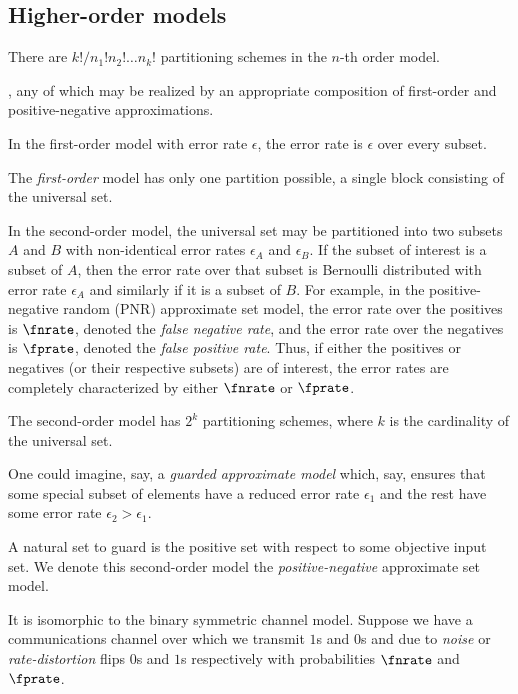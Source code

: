 \documentclass[
]{article}
\begin{document}
\hypertarget{higher-order-models}{%
\subsection{Higher-order models}\label{higher-order-models}}

There are \(k! / n_1! n_2! \ldots n_k!\) partitioning schemes in the
\(n\)-th order model.

, any of which may be realized by an appropriate composition of
first-order and positive-negative approximations.

In the first-order model with error rate \(\epsilon\), the error rate is
\(\epsilon\) over every subset.

The \emph{first-order} model has only one partition possible, a single
block consisting of the universal set.

In the second-order model, the universal set may be partitioned into two
subsets \(A\) and \(B\) with non-identical error rates \(\epsilon_A\)
and \(\epsilon_B\). If the subset of interest is a subset of \(A\), then
the error rate over that subset is Bernoulli distributed with error rate
\(\epsilon_A\) and similarly if it is a subset of \(B\). For example, in
the positive-negative random (PNR) approximate set model, the error rate
over the positives is \(\fnrate\), denoted the \emph{false negative
rate}, and the error rate over the negatives is \(\fprate\), denoted the
\emph{false positive rate}. Thus, if either the positives or negatives
(or their respective subsets) are of interest, the error rates are
completely characterized by either \(\fnrate\) or \(\fprate\).

The second-order model has \(2^k\) partitioning schemes, where \(k\) is
the cardinality of the universal set.

One could imagine, say, a \emph{guarded approximate model} which, say,
ensures that some special subset of elements have a reduced error rate
\(\epsilon_1\) and the rest have some error rate
\(\epsilon_2 > \epsilon_1\).

A natural set to guard is the positive set with respect to some
objective input set. We denote this second-order model the
\emph{positive-negative} approximate set model.

It is isomorphic to the binary symmetric channel model. Suppose we have
a communications channel over which we transmit \(1\)s and \(0\)s and
due to \emph{noise} or \emph{rate-distortion} flips \(0\)s and \(1\)s
respectively with probabilities \(\fnrate\) and \(\fprate\).
\end{document}
